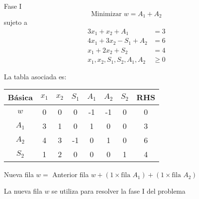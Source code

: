 \documentclass{beamer}
\begin{document}
\begin{frame}{Fase I}
    \[
    \text{Minimizar } w = A_1 + A_2
    \]
    sujeto a
    \[
    \begin{aligned}
    3x_1 + x_2 + A_1 &= 3 \\
    4x_1 + 3x_2 - S_1 + A_2 &= 6 \\
    x_1 + 2x_2 + S_2 &= 4 \\
    x_1, x_2, S_1, S_2, A_1, A_2 &\geq 0
    \end{aligned}
    \]

La tabla asociada es:
    \begin{table}
    \centering
    \begin{tabular}{c|c c c c c c|c}
    Básica & $x_1$ & $x_2$ & $S_1$ & $A_1$ & $A_2$ & $S_2$ & RHS \\
    \hline
    $w$   & 0 & 0 & 0 & -1 & -1 & 0 & 0 \\
    $A_1$ & 3 & 1 & 0 & 1 & 0 & 0 & 3 \\
    $A_2$ & 4 & 3 & -1 & 0 & 1 & 0 & 6 \\
    $S_2$ & 1 & 2 & 0 & 0 & 0 & 1 & 4 \\
    \end{tabular}
    \end{table}
    Nueva fila \( w = \) Anterior fila \( w + (1 \times \text{fila } A_1) + (1\times \text{fila } A_2) \)

    La nueva fila \( w \) se utiliza para resolver la fase I del problema
\end{frame}
\end{document}
